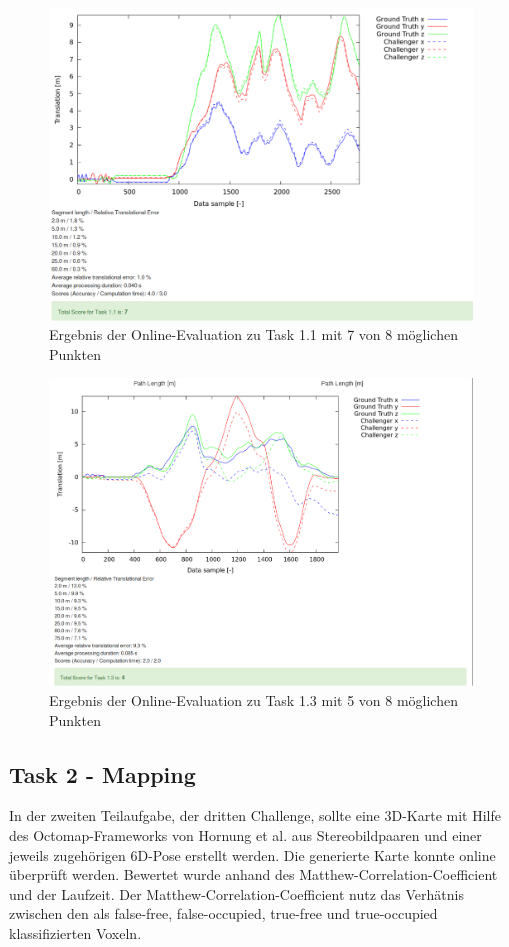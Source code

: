 \documentclass[12pt,titlepage, a4paper]{article}
\begin{document}
\begin{figure}
 \centering
 \includegraphics[width=\textwidth]{./Screens/t1_opt2_april.png}
 \caption{Ergebnis der Online-Evaluation zu Task 1.1 mit 7 von 8 möglichen Punkten} \label{fig:evat1}
\end{figure}
\begin{figure}
 \centering
 \includegraphics[width=\textwidth]{./Screens/t3_checkerboard.png}
 \caption{Ergebnis der Online-Evaluation zu Task 1.3 mit 5 von 8 möglichen Punkten} \label{fig:evat3}
\end{figure}


				
\subsection{Task 2 - Mapping}
In der zweiten Teilaufgabe, der dritten Challenge, sollte eine 3D-Karte mit Hilfe des Octomap-Frameworks von Hornung et al. aus Stereobildpaaren und einer jeweils zugehörigen 6D-Pose erstellt werden. Die generierte Karte konnte online überprüft werden. Bewertet wurde anhand des Matthew-Correlation-Coefficient und der Laufzeit. Der Matthew-Correlation-Coefficient nutz das Verhätnis zwischen den als false-free, false-occupied, true-free und true-occupied klassifizierten Voxeln.
\end{document}
